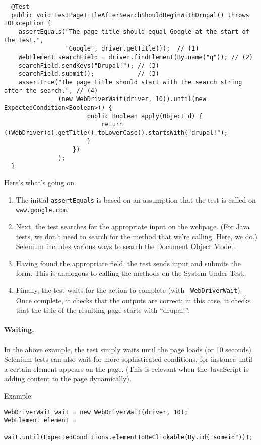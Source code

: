 \documentclass[11pt]{article}
\begin{document}
\begin{lstlisting}
  @Test
  public void testPageTitleAfterSearchShouldBeginWithDrupal() throws IOException {
    assertEquals("The page title should equal Google at the start of the test.",
                 "Google", driver.getTitle());  // (1)
    WebElement searchField = driver.findElement(By.name("q")); // (2)
    searchField.sendKeys("Drupal!"); // (3)
    searchField.submit();            // (3)
    assertTrue("The page title should start with the search string after the search.", // (4)
               (new WebDriverWait(driver, 10)).until(new ExpectedCondition<Boolean>() {
                       public Boolean apply(Object d) {
                           return ((WebDriver)d).getTitle().toLowerCase().startsWith("drupal!");
                       }
                   })
               );
  }
\end{lstlisting}

Here's what's going on.
\begin{enumerate}[noitemsep]
\item The initial {\tt assertEquals} is based on an assumption that the test is called on
  {\tt www.google.com}.
\item Next, the test searches for the appropriate input on the
  webpage. (For Java tests, we don't need to search for the method
  that we're calling. Here, we do.) Selenium includes various ways to
  search the Document Object Model.
\item Having found the appropriate field, the test sends input and submits the form.
  This is analogous to calling the methods on the System Under Test.
\item Finally, the test waits for the action to complete (with {\tt
  WebDriverWait}). Once complete, it checks that the outputs are
  correct; in this case, it checks that the title of the resulting
  page starts with ``drupal!''.
\end{enumerate}

\paragraph{Waiting.} In the above example, the test simply waits until the page loads (or 10 seconds). Selenium tests can also wait for more sophisticated conditions, for instance until a certain element appears on the page. (This is relevant when the JavaScript is adding content to the page dynamically).

Example:
\begin{lstlisting}
WebDriverWait wait = new WebDriverWait(driver, 10);
WebElement element =
  wait.until(ExpectedConditions.elementToBeClickable(By.id("someid")));
\end{lstlisting}
\end{document}

